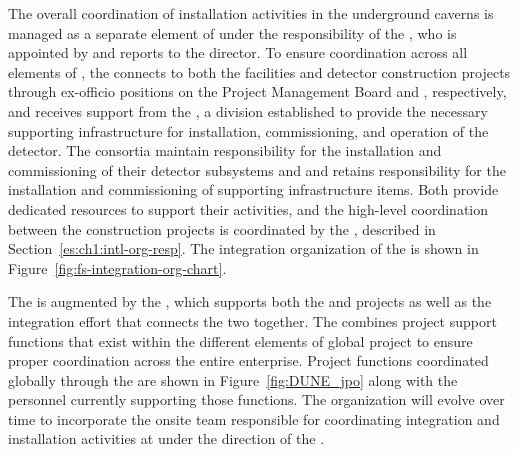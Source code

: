 The overall
coordination of installation activities in the underground caverns 
is managed as a separate element of  under the
responsibility of the , who is appointed by and reports
to the  director.  To ensure coordination across
all elements of , the  connects to both
the facilities and detector construction projects through ex-officio
positions on the  Project Management Board and
 , respectively, %
and receives support from the ,
a  division established to 
provide the necessary supporting infrastructure for installation, commissioning, and operation 
of the  detector.
The  consortia maintain responsibility 
for the installation and commissioning of their detector subsystems
and %
and  retains responsibility
for the installation and commissioning of supporting infrastructure
items. 
Both provide dedicated resources to support their activities, and the high-level
coordination between the construction 
projects is coordinated by the , described in Section~\ref{es:ch1:intl-org-resp}.    
The 
 integration organization of the  is shown in Figure~\ref{fig:fs-integration-org-chart}. 


The  is augmented by the , which supports both 
the  and  projects as well as the integration
effort that connects the two together. The  combines
project support functions that exist within the different elements 
of global project to ensure proper coordination across the entire 
 enterprise.  Project functions coordinated globally 
through the  are shown in Figure~\ref{fig:DUNE_jpo} along 
with the personnel currently supporting those functions.
The  organization will evolve over time to incorporate the 
onsite team responsible for coordinating integration and installation 
activities at  under the direction of the .  %

